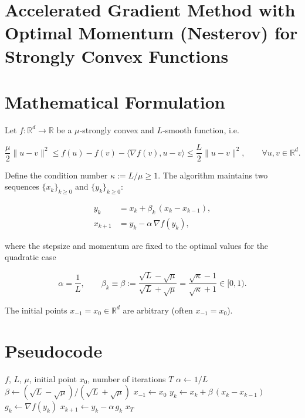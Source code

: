 \documentclass{article}
\begin{document}
\section*{Accelerated Gradient Method with Optimal Momentum (Nesterov) for Strongly Convex Functions}

\section*{Mathematical Formulation}
Let $f:\mathbb{R}^{d}\to\mathbb{R}$ be a $\mu$‑strongly convex and $L$‑smooth function, i.e.  

\[
\frac{\mu}{2}\|u-v\|^{2}\le f(u)-f(v)-\langle\nabla f(v),u-v\rangle\le 
\frac{L}{2}\|u-v\|^{2},\qquad\forall u,v\in\mathbb{R}^{d}.
\]

Define the condition number $\kappa:=L/\mu\ge 1$.  
The algorithm maintains two sequences $\{x_k\}_{k\ge 0}$ and $\{y_k\}_{k\ge 0}$:

\[
\boxed{
\begin{aligned}
y_k &= x_k+\beta_k\,(x_k-x_{k-1}),\\[2mm]
x_{k+1} &= y_k-\alpha\,\nabla f(y_k),
\end{aligned}}
\tag{1}
\]

where the stepsize and momentum are fixed to the optimal values for the quadratic case  

\[
\alpha=\frac{1}{L},\qquad 
\beta_k\equiv\beta:=\frac{\sqrt{L}-\sqrt{\mu}}{\sqrt{L}+\sqrt{\mu}}
          =\frac{\sqrt{\kappa}-1}{\sqrt{\kappa}+1}\in[0,1).
\tag{2}
\]

The initial points $x_{-1}=x_0\in\mathbb{R}^{d}$ are arbitrary (often $x_{-1}=x_0$).

\section*{Pseudocode}
\begin{algorithm}[H]
\caption{Accelerated Gradient with Optimal Momentum}
\begin{algorithmic}[1]
\Require $f$, $L$, $\mu$, initial point $x_0$, number of iterations $T$
\State $\alpha\gets 1/L$
\State $\beta\gets (\sqrt{L}-\sqrt{\mu})/(\sqrt{L}+\sqrt{\mu})$
\State $x_{-1}\gets x_0$ 
    \State $y_k \gets x_k + \beta\,(x_k-x_{k-1})$ 
    \State $g_k \gets \nabla f(y_k)$
    \State $x_{k+1} \gets y_k - \alpha\, g_k$ 
\EndFor
\State \Return $x_T$
\end{algorithmic}
\end{algorithm}
\end{document}
